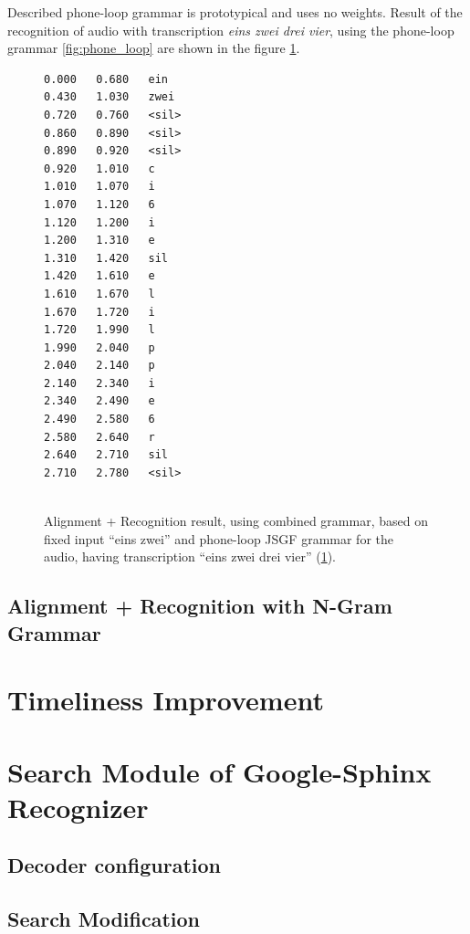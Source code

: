 Described phone-loop grammar is prototypical and uses no weights. Result of the
recognition of audio with transcription \textit {eins zwei drei
vier}, using the phone-loop grammar   \ref{fig:phone_loop} are shown in the
figure \ref{fig:phone_loop_res}.
\begin{figure}[htbp]
 \centering 
\begin{center}
\begin{lstlisting}[frame=single]
0.000	0.680	ein
0.430	1.030	zwei
0.720	0.760	<sil>
0.860	0.890	<sil>
0.890	0.920	<sil>
0.920	1.010	c
1.010	1.070	i
1.070	1.120	6
1.120	1.200	i
1.200	1.310	e
1.310	1.420	sil
1.420	1.610	e
1.610	1.670	l
1.670	1.720	i
1.720	1.990	l
1.990	2.040	p
2.040	2.140	p
2.140	2.340	i
2.340	2.490	e
2.490	2.580	6
2.580	2.640	r
2.640	2.710	sil
2.710	2.780	<sil>


\end{lstlisting}
\end{center}
 \caption{Alignment + Recognition result, using combined grammar, based on
 fixed input ``eins zwei'' and phone-loop JSGF grammar for the audio, having
 transcription ``eins zwei drei vier'' (\ref{fig:phone_loop_res}).}
 
  \label{fig:phone_loop_res}
\end {figure}


\subsection {Alignment + Recognition with N-Gram Grammar}



\section {Timeliness Improvement}




\section {Search Module of Google-Sphinx Recognizer}
\subsection {Decoder configuration}
\subsection {Search Modification}